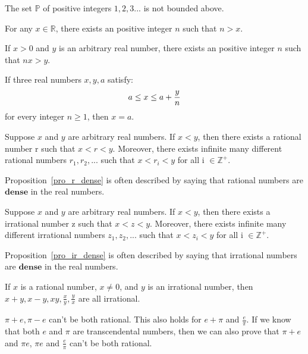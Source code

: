 \documentclass[a4paper]{ctexart}
\begin{document}
	\begin{mythm}
		The set $\mathbb{P}$ of positive integers $1,2,3...$ is not bounded above.
	\end{mythm}
	\begin{mythm}
		For any $x\in \mathbb{R}$, there exists an positive integer $n$ such that $n>x$.
	\end{mythm}
	\begin{mythm}
		If $x>0$ and $y$ is an arbitrary real number, there exists an positive integer $n$ such that $nx>y$.
	\end{mythm}
	\begin{mythm}
		If three real numbers $x,y,a$ satisfy:
		\begin{equation}
			a\le x \le a+\frac{y}{n}\notag
		\end{equation}
		for every integer $n\ge 1$, then $x=a$.
	\end{mythm}
	\begin{mypro}\label{pro_r_dense}
		Suppose $x$ and $y$ are arbitrary real numbers. If $x<y$, then there exists a rational number r such that $x<r<y$. Moreover, there exists infinite many different rational numbers $r_1,r_2,...$ such that $x<r_i<y$ for all i $\in \mathbb{Z}^+$.
	\end{mypro}
	\begin{myrmk}
		Proposition~\ref{pro_r_dense} is often described by saying that rational numbers are $\mathbf{dense}$ in the real numbers.
	\end{myrmk}
	\begin{mypro}\label{pro_ir_dense}
		Suppose $x$ and $y$ are arbitrary real numbers. If $x<y$, then there exists a irrational number z such that $x<z<y$. Moreover, there exists infinite many different irrational numbers $z_1,z_2,...$ such that $x<z_i<y$ for all i $\in \mathbb{Z}^+$.
	\end{mypro}
	\begin{myrmk}
		Proposition~\ref{pro_ir_dense} is often described by saying that irrational numbers are $\mathbf{dense}$ in the real numbers.
	\end{myrmk}
	\begin{mypro}
		If $x$ is a rational number, $x\neq 0$, and $y$ is an irrational number, then $x+y,x-y,xy,\frac{x}{y},\frac{y}{x}$ are all irrational.
	\end{mypro}
	\begin{mypro}
		$\pi+e,\pi-e$ can't be both rational. This also holds for $e+\pi$ and $ \frac{e}{\pi}$. If we know that both $e$ and $\pi$ are transcendental numbers, then we can also prove that $\pi+e$ and $\pi e$, $\pi e$ and $\frac{e}{\pi}$ can't be both rational.
	\end{mypro}
\end{document}
